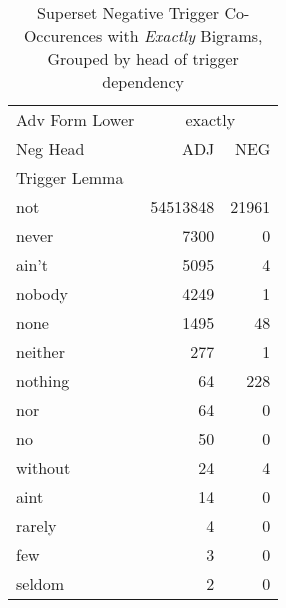 
\begin{table}[ht]
\caption{Superset Negative Trigger Co-Occurences with \textit{Exactly} Bigrams,\\Grouped by head of trigger dependency}
\label{trig-exactly-head-f}
\begin{tabular}{lrr}
\toprule
Adv Form Lower & \multicolumn{2}{|c|}{exactly} \\
Neg Head & ADJ & NEG \\
Trigger Lemma &  &  \\
\midrule
not & {\cellcolor[HTML]{023858}} \color[HTML]{F1F1F1} 54513848 & {\cellcolor[HTML]{04598C}} \color[HTML]{F1F1F1} 21961 \\
never & {\cellcolor[HTML]{C2CBE2}} \color[HTML]{000000} 7300 & {\cellcolor[HTML]{FFF7FB}} \color[HTML]{000000} 0 \\
ain't & {\cellcolor[HTML]{DAD9EA}} \color[HTML]{000000} 5095 & {\cellcolor[HTML]{FFF7FB}} \color[HTML]{000000} 4 \\
nobody & {\cellcolor[HTML]{E2DFEE}} \color[HTML]{000000} 4249 & {\cellcolor[HTML]{FFF7FB}} \color[HTML]{000000} 1 \\
none & {\cellcolor[HTML]{F6EFF7}} \color[HTML]{000000} 1495 & {\cellcolor[HTML]{FFF7FB}} \color[HTML]{000000} 48 \\
neither & {\cellcolor[HTML]{FEF6FA}} \color[HTML]{000000} 277 & {\cellcolor[HTML]{FFF7FB}} \color[HTML]{000000} 1 \\
nothing & {\cellcolor[HTML]{FFF7FB}} \color[HTML]{000000} 64 & {\cellcolor[HTML]{FEF6FA}} \color[HTML]{000000} 228 \\
nor & {\cellcolor[HTML]{FFF7FB}} \color[HTML]{000000} 64 & {\cellcolor[HTML]{FFF7FB}} \color[HTML]{000000} 0 \\
no & {\cellcolor[HTML]{FFF7FB}} \color[HTML]{000000} 50 & {\cellcolor[HTML]{FFF7FB}} \color[HTML]{000000} 0 \\
without & {\cellcolor[HTML]{FFF7FB}} \color[HTML]{000000} 24 & {\cellcolor[HTML]{FFF7FB}} \color[HTML]{000000} 4 \\
aint & {\cellcolor[HTML]{FFF7FB}} \color[HTML]{000000} 14 & {\cellcolor[HTML]{FFF7FB}} \color[HTML]{000000} 0 \\
rarely & {\cellcolor[HTML]{FFF7FB}} \color[HTML]{000000} 4 & {\cellcolor[HTML]{FFF7FB}} \color[HTML]{000000} 0 \\
few & {\cellcolor[HTML]{FFF7FB}} \color[HTML]{000000} 3 & {\cellcolor[HTML]{FFF7FB}} \color[HTML]{000000} 0 \\
seldom & {\cellcolor[HTML]{FFF7FB}} \color[HTML]{000000} 2 & {\cellcolor[HTML]{FFF7FB}} \color[HTML]{000000} 0 \\
\bottomrule
\end{tabular}
\end{table}

